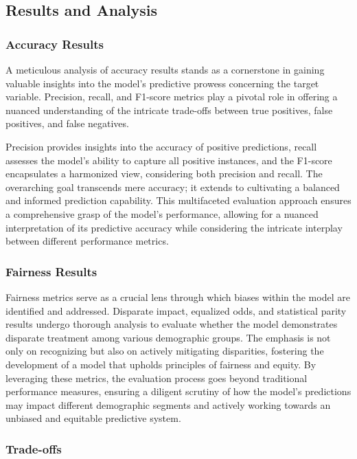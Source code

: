 \subsection{Results and Analysis}

\subsubsection{Accuracy Results}

A meticulous analysis of accuracy results stands as a cornerstone in gaining valuable insights into the model's predictive prowess concerning the target variable. Precision, recall, and F1-score metrics play a pivotal role in offering a nuanced understanding of the intricate trade-offs between true positives, false positives, and false negatives.

Precision provides insights into the accuracy of positive predictions, recall assesses the model's ability to capture all positive instances, and the F1-score encapsulates a harmonized view, considering both precision and recall. The overarching goal transcends mere accuracy; it extends to cultivating a balanced and informed prediction capability. This multifaceted evaluation approach ensures a comprehensive grasp of the model's performance, allowing for a nuanced interpretation of its predictive accuracy while considering the intricate interplay between different performance metrics.

\subsubsection{Fairness Results}

Fairness metrics serve as a crucial lens through which biases within the model are identified and addressed. Disparate impact, equalized odds, and statistical parity results undergo thorough analysis to evaluate whether the model demonstrates disparate treatment among various demographic groups. The emphasis is not only on recognizing but also on actively mitigating disparities, fostering the development of a model that upholds principles of fairness and equity. By leveraging these metrics, the evaluation process goes beyond traditional performance measures, ensuring a diligent scrutiny of how the model's predictions may impact different demographic segments and actively working towards an unbiased and equitable predictive system.

\subsubsection{Trade-offs}


